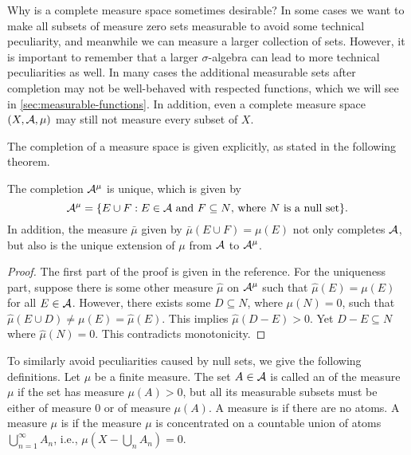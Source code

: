 Why is a complete measure space sometimes desirable? In some cases we want to make all subsets of measure zero sets measurable to avoid some technical peculiarity, and meanwhile we can measure a larger collection of sets. However, it is important to remember that a larger $\sigma$-algebra can lead to more technical peculiarities as well. In many cases the additional measurable sets after completion may not be well-behaved with respected functions, which we will see in \cref{sec:measurable-functions}. In addition, even a complete measure space $(X,\mathcal{A},\mu)$ may still not measure every subset of $X$.

The completion of a measure space is given explicitly, as stated in the following theorem.

\begin{thm}
    The completion $\mathcal{A}^\mu$ is unique, which is given by \[
        \mathcal{A}^\mu =\{E\cup F:E\in\mathcal{A}\text{ and }F\subseteq N\text{, where }N\text{ is a null set}\}.
    \]
    In addition, the measure $\bar{\mu}$ given by $\bar{\mu}(E\cup F)=\mu(E)$ not only completes $\mathcal{A}$, but also is the unique extension of $\mu$ from $\mathcal{A}$ to $\mathcal{A}^\mu$.
\end{thm}
\begin{proof}
    The first part of the proof is given in the reference. For the uniqueness part, suppose there is some other measure $\hat{\mu}$ on $\mathcal{A}^\mu$ such that $\hat{\mu}(E) = \mu(E)$ for all $E \in \mathcal{A}$. However, there exists some $D \subseteq N$, where $\mu(N) = 0$, such that $\hat{\mu}(E \cup D) \neq \mu(E) = \hat{\mu}(E)$. This implies $\hat{\mu}(D - E) > 0$. Yet $D - E \subseteq N$ where $\hat{\mu}(N) = 0$. This contradicts monotonicity.
\end{proof}

To similarly avoid peculiarities caused by null sets, we give the following definitions. Let $\mu$ be a finite measure. The set $A \in \mathcal{A}$ is called an  of the measure $\mu$ if the set has measure $\mu(A) > 0$, but all its measurable subsets must be either of measure $0$ or of measure $\mu(A)$. A measure is  if there are no atoms. A measure $\mu$ is  if the measure $\mu$ is concentrated on a countable union of atoms $\bigcup_{n=1}^\infty A_n$, i.e., $\mu(X - \bigcup_n A_n) = 0$.


